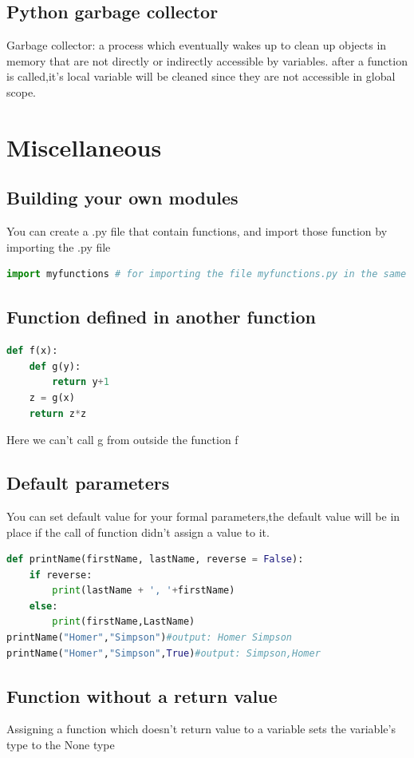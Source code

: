 \documentclass[12pt,oneside]{book}
\begin{document}
\subsection{Python garbage collector}
Garbage collector: a process which eventually wakes up to clean up objects in memory that are not directly or indirectly accessible by variables.
after a function is called,it's local variable will be cleaned since they are not accessible in global scope.
\section{Miscellaneous}
\subsection{Building your own modules}
You can create a .py file that contain functions, and import those function by importing the .py file
{\small\begin{lstlisting}[language=python]
import myfunctions # for importing the file myfunctions.py in the same directory
\end{lstlisting}}
\subsection{Function defined in another function}
{\small\begin{lstlisting}[language=python]
def f(x):
	def g(y):
		return y+1 
	z = g(x)
	return z*z
\end{lstlisting}}
Here we can't call g from outside the function f
\subsection{Default parameters}
You can set default value for your formal parameters,the default value will be in place if the call of function didn't assign a value to it.
{\small\begin{lstlisting}[language=python]
def printName(firstName, lastName, reverse = False):
	if reverse:
		print(lastName + ', '+firstName)
	else: 
		print(firstName,LastName) 
printName("Homer","Simpson")#output: Homer Simpson 
printName("Homer","Simpson",True)#output: Simpson,Homer
\end{lstlisting}}
\subsection{Function without a return value}
Assigning a function which doesn't return value to a variable sets the variable's type to the None type
\end{document}
